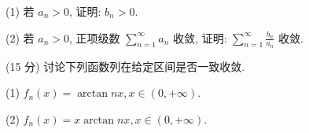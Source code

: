 (1) 若 $a_{n} > 0$, 证明: $b_{n} > 0$.\par
(2) 若 $a_{n} > 0$, 正项级数 $\sum_{n=1}^{\infty} a_{n}$ 收敛, 证明: $\sum_{n=1}^{\infty} \frac{b_{n}}{a_{n}}$ 收敛.\par
\par{}
(15 分) 讨论下列函数列在给定区间是否一致收敛.\par
(1) $f_{n}(x) = \arctan nx, x \in (0, +\infty)$.\par
(2) $f_{n}(x) = x\arctan nx, x\in (0, + \infty).$\par
